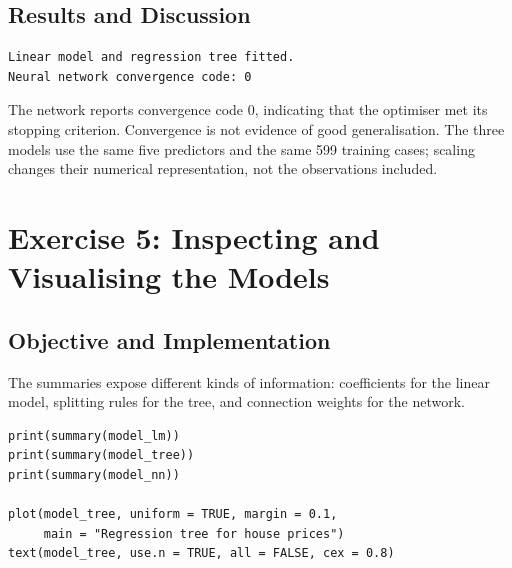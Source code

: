\documentclass[11pt,a4paper]{article}
\begin{document}
\subsection{Results and Discussion}
\par\noindent\begin{minipage}{\linewidth}
\begin{lstlisting}[style=console]
Linear model and regression tree fitted.
Neural network convergence code: 0
\end{lstlisting}
\end{minipage}\par
The network reports convergence code 0, indicating that the optimiser met its stopping criterion. Convergence is not evidence of good generalisation. The three models use the same five predictors and the same 599 training cases; scaling changes their numerical representation, not the observations included.

\section{Exercise 5: Inspecting and Visualising the Models}
\subsection{Objective and Implementation}
The summaries expose different kinds of information: coefficients for the linear model, splitting rules for the tree, and connection weights for the network.
\begin{lstlisting}
print(summary(model_lm))
print(summary(model_tree))
print(summary(model_nn))

plot(model_tree, uniform = TRUE, margin = 0.1,
     main = "Regression tree for house prices")
text(model_tree, use.n = TRUE, all = FALSE, cex = 0.8)
\end{lstlisting}
\end{document}
